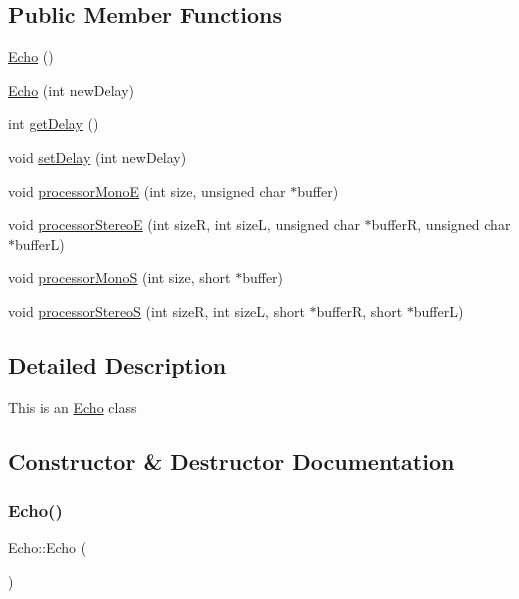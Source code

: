 \subsection*{Public Member Functions}
\begin{DoxyCompactItemize}
\item 
\hyperlink{classEcho_ababd42898feed0775f5234d53fe9bff1}{Echo} ()
\item 
\hyperlink{classEcho_a28d71de619dda9e6e51567a04bfb60d6}{Echo} (int new\+Delay)
\item 
int \hyperlink{classEcho_a57e19c9232f9bb96ccd78ba4bb68d6c9}{get\+Delay} ()
\item 
void \hyperlink{classEcho_a3096c57223d6f7ce3097d15e8bf4a0ed}{set\+Delay} (int new\+Delay)
\item 
void \hyperlink{classEcho_a472cc906604bcb493c6a6c1227436938}{processor\+MonoE} (int size, unsigned char $\ast$buffer)
\item 
void \hyperlink{classEcho_a92aa2d47f32f5ad0f2cd45121e8d457f}{processor\+StereoE} (int sizeR, int sizeL, unsigned char $\ast$bufferR, unsigned char $\ast$bufferL)
\item 
void \hyperlink{classEcho_a298f9fe12295c578737928544c46be1a}{processor\+MonoS} (int size, short $\ast$buffer)
\item 
void \hyperlink{classEcho_a26ebcc62f7d6be2e3bd4ac1833636549}{processor\+StereoS} (int sizeR, int sizeL, short $\ast$bufferR, short $\ast$bufferL)
\end{DoxyCompactItemize}


\subsection{Detailed Description}
This is an \hyperlink{classEcho}{Echo} class 

\subsection{Constructor \& Destructor Documentation}
\mbox{\label{classEcho_ababd42898feed0775f5234d53fe9bff1}} 
\subsubsection{\texorpdfstring{Echo()}{Echo()}\hspace{0.1cm}{\footnotesize\ttfamily [1/2]}}
{\footnotesize\ttfamily Echo\+::\+Echo (\begin{DoxyParamCaption}{ }\end{DoxyParamCaption})}


